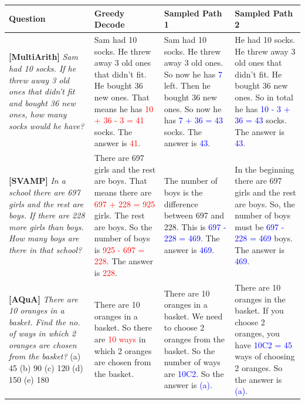 \begin{table}[h]
\scriptsize
    \centering
    \begin{tabular}{p{3.2cm} | p{3.1cm} | p{2.6cm} | p{3.3cm} }
        Question & Greedy Decode & Sampled Path 1 & Sampled Path 2  \\
        \midrule
        \textbf{[MultiArith]}  \textit{Sam had 10 socks. If he threw away 3 old ones that didn't fit and bought 36 new ones, how many socks would he have?}
         & Sam had 10 socks. He threw away 3 old ones that didn't fit. He bought 36 new ones. That means he has \textcolor{red}{10 + 36 - 3 = 41} socks. The answer is \textcolor{red}{41}.
         & Sam had 10 socks. He threw away 3 old ones. So now he has \textcolor{blue}{7} left. Then he bought 36 new ones. So now he has \textcolor{blue}{7 + 36 = 43} socks. The answer is \textcolor{blue}{43}.  
         & He had 10 socks. He threw away 3 old ones that didn't fit. He bought 36 new ones. So in total he has \textcolor{blue}{10 - 3 + 36 = 43} socks. The answer is \textcolor{blue}{43}.  \\
         \midrule
        \textbf{[SVAMP]}   \textit{In a school there are 697 girls and the rest are boys. If there are 228 more girls than boys. How many boys are there in that school?}
         & There are 697 girls and the rest are boys. That means there are \textcolor{red}{697 + 228 = 925} girls. The rest are boys. So the number of boys is \textcolor{red}{925 - 697 = 228}. The answer is \textcolor{red}{228}. 
         & The number of boys is the difference between 697 and 228. This is \textcolor{blue}{697 - 228 = 469}. The answer is \textcolor{blue}{469}.  
         & In the beginning there are 697 girls and the rest are boys. So, the number of boys must be \textcolor{blue}{697 - 228 = 469} boys. The answer is \textcolor{blue}{469}.  \\
         \midrule
         \textbf{[AQuA]} \textit{There are 10 oranges in a basket. Find the no. of ways in which 2 oranges are chosen from the basket?} (a) 45 (b) 90 (c) 120 (d) 150 (e) 180
         & There are 10 oranges in a basket. So there are \textcolor{red}{10 ways} in which 2 oranges are chosen from the basket.  
         & There are 10 oranges in a basket. We need to choose 2 oranges from the basket. So the number of ways are \textcolor{blue}{10C2}. So the answer is \textcolor{blue}{(a)}.  
         & There are 10 oranges in the basket. If you choose 2 oranges, you have \textcolor{blue}{10C2 = 45} ways of choosing 2 oranges. So the answer is \textcolor{blue}{(a)}.  \\

\end{tabular}
\end{table}
